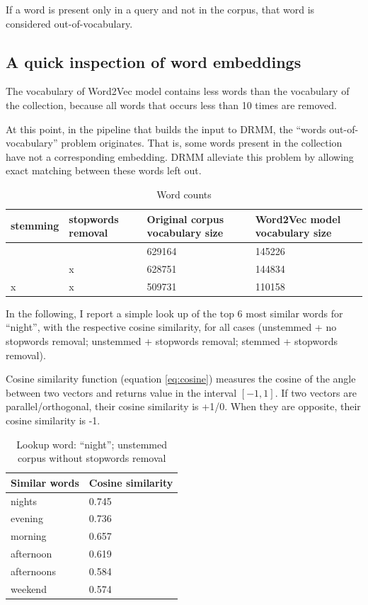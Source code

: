 If a word is present only in a query and not in the corpus, that word is considered out-of-vocabulary.

\subsection{A quick inspection of word embeddings}

The vocabulary of Word2Vec model contains less words than the vocabulary of the collection, because all words that occurs less than 10 times are removed.

At this point, in the pipeline that builds the input to DRMM, the ``words out-of-vocabulary'' problem originates. That is, some words present in the collection have not a corresponding embedding. DRMM alleviate this problem by allowing exact matching between these words left out.

\begin{table}[H]
\centering
\begin{tabular}{p{2cm}p{2cm}p{4cm}p{4cm}}
\textbf{stemming} & \textbf{stopwords removal} & \textbf{Original corpus vocabulary size} & \textbf{Word2Vec model vocabulary size} \\ \hline
& & 629164 & 145226 \\
& x & 628751 & 144834 \\
x & x & 509731 & 110158 \\
\end{tabular}
\caption{Word counts}
\end{table}

In the following, I report a simple look up of the top 6 most similar words for ``night'', with the respective cosine similarity, for all cases (unstemmed + no stopwords removal; unstemmed + stopwords removal; stemmed + stopwords removal).

Cosine similarity function (equation \ref{eq:cosine}) measures the cosine of the angle between two vectors and returns value in the interval $[-1, 1]$. If two vectors are parallel/orthogonal, their cosine similarity is +1/0. When they are opposite, their cosine similarity is -1.

\begin{table}[H]
\centering
\begin{tabular}{ll}
\textbf{Similar words} & \textbf{Cosine similarity} \\ \hline  
nights & 0.745 \\
evening & 0.736\\
morning & 0.657 \\
afternoon & 0.619 \\
afternoons & 0.584 \\
weekend & 0.574 \\
\end{tabular}
\caption{Lookup word: ``night''; unstemmed corpus without stopwords removal}
\end{table}

